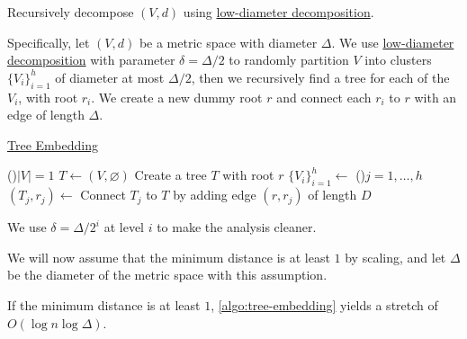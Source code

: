\begin{intuition}
  Recursively decompose \((V, d)\) using \hyperref[def:low-diameter-decomposition]{low-diameter decomposition}.
\end{intuition}

Specifically, let \((V, d)\) be a metric space with diameter \(\Delta \). We use \hyperref[def:low-diameter-decomposition]{low-diameter decomposition} with parameter \(\delta = \Delta / 2\) to randomly partition \(V\) into clusters \(\{ V_i \} _{i=1}^{h}\) of diameter at most \(\Delta / 2\), then we recursively find a tree for each of the \(V_i\), with root \(r_i\). We create a new dummy root \(r\) and connect each \(r_i\) to \(r\) with an edge of length \(\Delta \).

\begin{algorithm}[H]\label{algo:tree-embedding}
  \DontPrintSemicolon{}
  \caption{\hyperref[prb:tree-embedding]{Tree Embedding}}

  \BlankLine

  \If(){\(\lvert V \rvert = 1\)}{
    \(T \gets (V, \varnothing )\)\;
  }
  \;
  Create a tree \(T\) with root \(r\)\;
  \(\{ V_i \} _{i=1}^{h} \gets\)\;
  \For(){\(j = 1, \dots , h\)}{
    \((T_j, r_j)\gets\)\;
    Connect \(T_j\) to \(T\) by adding edge \((r, r_j)\) of length \(D\)\;
  }
  \;
\end{algorithm}

\begin{notation}
  We use \(\delta = \Delta / 2^i\) at level \(i\) to make the analysis cleaner.
\end{notation}

We will now assume that the minimum distance is at least \(1\) by scaling, and let \(\Delta \) be the diameter of the metric space with this assumption.

\begin{remark}
  If the minimum distance is at least \(1\), \autoref{algo:tree-embedding} yields a stretch of \(O(\log n \log \Delta )\).
\end{remark}

